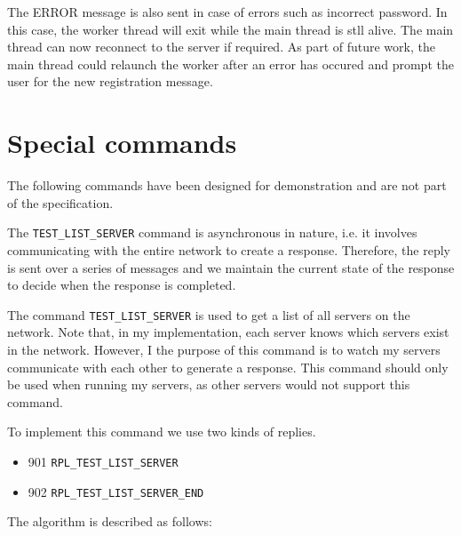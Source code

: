 \documentclass[letterpaper,twocolumn,10pt]{article}
\begin{document}
The ERROR message is also sent in case of errors such as incorrect password. In this case,
the worker thread will exit while the main thread is stll alive. The main thread can now reconnect
to the server if required. As part of future work, the main thread could relaunch the worker after an error
has occured and prompt the user for the new registration message.

\section{Special commands}

The following commands have been designed for demonstration and are not part of
the specification.

The \verb|TEST_LIST_SERVER| command is asynchronous in nature, i.e. it involves communicating with the
entire network to create a response. Therefore, the reply is sent over a series of messages and we
maintain the current state of the response to decide when the response is completed.

The command \verb|TEST_LIST_SERVER| is used to get a list of all servers on the
network. Note that, in my implementation, each server knows which servers exist
in the network. However, I the purpose of this command is to watch my servers
communicate with each other to generate a response. This command should only be used 
when running my servers, as other servers would not support this command.

To implement this command we use two kinds of replies.

\begin{itemize}
	\item 901 \verb|RPL_TEST_LIST_SERVER|
	\item 902 \verb|RPL_TEST_LIST_SERVER_END|
\end{itemize}

The algorithm is described as follows:
\end{document}
